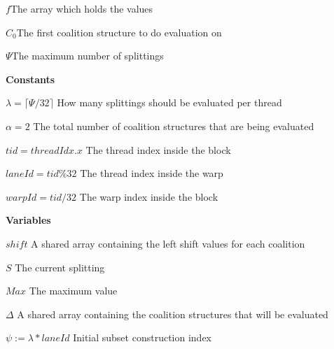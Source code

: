 \documentclass[a4paper, 12pt]{report}
\begin{document}
$f$\hfill The array which holds the values

$C_0$\hfill The first coalition structure to do evaluation on

$\Psi$\hfill The maximum number of splittings

\textbf{Constants}

$\lambda = \lceil\Psi/32\rceil$ \hfill How many splittings should be evaluated per thread

$\alpha = 2$ \hfill The total number of coalition structures that are being evaluated

$tid = threadIdx.x$ \hfill The thread index inside the block

$laneId = tid \% 32$ \hfill The thread index inside the warp

$warpId = tid / 32$ \hfill The warp index inside the block

\textbf{Variables} 

$shift$ \hfill A shared array containing the left shift values for each coalition

$S$ \hfill The current splitting

$Max$ \hfill The maximum value

$\Delta$ \hfill A shared array containing the coalition structures that will be evaluated 


$\psi := \lambda*laneId$ \hfill Initial subset construction index
\end{document}
